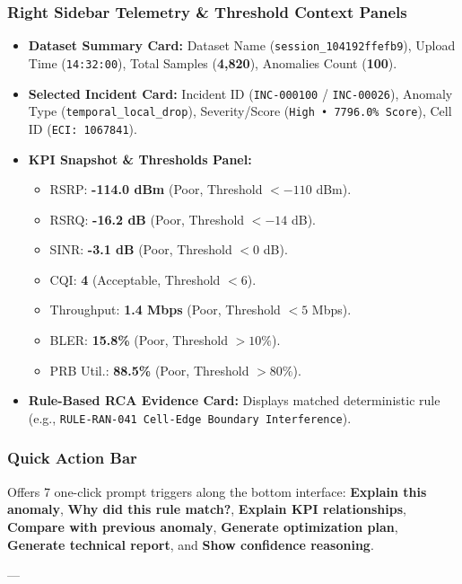 \documentclass[12pt,a4paper]{report}
\begin{document}
\subsubsection{Right Sidebar Telemetry \& Threshold Context Panels}
\begin{itemize}
    \item \textbf{Dataset Summary Card:} Dataset Name (\texttt{session\_104192ffefb9}), Upload Time (\texttt{14:32:00}), Total Samples (\textbf{4,820}), Anomalies Count (\textbf{100}).
    \item \textbf{Selected Incident Card:} Incident ID (\texttt{INC-000100} / \texttt{INC-00026}), Anomaly Type (\texttt{temporal\_local\_drop}), Severity/Score (\texttt{High • 7796.0\% Score}), Cell ID (\texttt{ECI: 1067841}).
    \item \textbf{KPI Snapshot \& Thresholds Panel:}
    \begin{itemize}
        \item RSRP: \textbf{-114.0 dBm} (Poor, Threshold $< -110$ dBm).
        \item RSRQ: \textbf{-16.2 dB} (Poor, Threshold $< -14$ dB).
        \item SINR: \textbf{-3.1 dB} (Poor, Threshold $< 0$ dB).
        \item CQI: \textbf{4} (Acceptable, Threshold $< 6$).
        \item Throughput: \textbf{1.4 Mbps} (Poor, Threshold $< 5$ Mbps).
        \item BLER: \textbf{15.8\%} (Poor, Threshold $> 10\%$).
        \item PRB Util.: \textbf{88.5\%} (Poor, Threshold $> 80\%$).
    \end{itemize}
    \item \textbf{Rule-Based RCA Evidence Card:} Displays matched deterministic rule (e.g., \texttt{RULE-RAN-041 Cell-Edge Boundary Interference}).
\end{itemize}

\subsubsection{Quick Action Bar}
Offers 7 one-click prompt triggers along the bottom interface: \textbf{Explain this anomaly}, \textbf{Why did this rule match?}, \textbf{Explain KPI relationships}, \textbf{Compare with previous anomaly}, \textbf{Generate optimization plan}, \textbf{Generate technical report}, and \textbf{Show confidence reasoning}.

---
\end{document}
